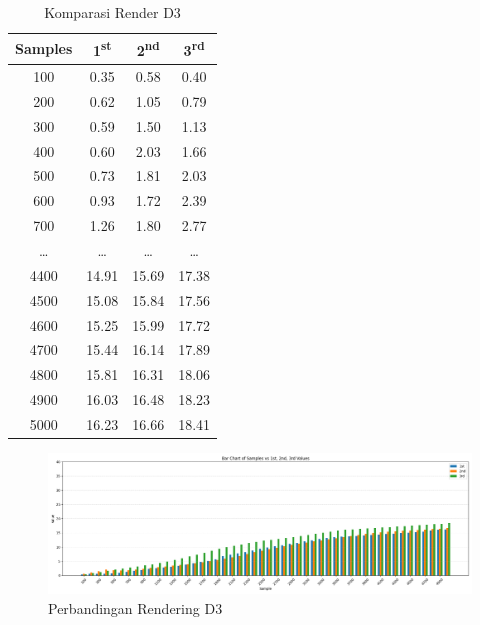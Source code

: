 \begin{table}[H]
	\centering
	\caption{Komparasi Render D3}
	\label{Komparasi Render D3}
	\renewcommand{\arraystretch}{1.2}
	\begin{tabular}{|c|c|c|c|}
		\hline
		\textbf{Samples} & \textbf{1\textsuperscript{st}} & \textbf{2\textsuperscript{nd}} & \textbf{3\textsuperscript{rd}} \\
		\hline
		100  & 0.35 & 0.58 & 0.40 \\
		200  & 0.62 & 1.05 & 0.79 \\
		300  & 0.59 & 1.50 & 1.13 \\
		400  & 0.60 & 2.03 & 1.66 \\
		500  & 0.73 & 1.81 & 2.03 \\
		600  & 0.93 & 1.72 & 2.39 \\
		700  & 1.26 & 1.80 & 2.77 \\
		\ldots & \ldots & \ldots & \ldots \\
		4400 & 14.91 & 15.69 & 17.38 \\
		4500 & 15.08 & 15.84 & 17.56 \\
		4600 & 15.25 & 15.99 & 17.72 \\
		4700 & 15.44 & 16.14 & 17.89 \\
		4800 & 15.81 & 16.31 & 18.06 \\
		4900 & 16.03 & 16.48 & 18.23 \\
		5000 & 16.23 & 16.66 & 18.41 \\
		\hline
	\end{tabular}
\end{table}

 	\begin{figure}[H]
	\centering
	\includegraphics[width=0.8\linewidth]{gambar/Pembahasan/FIX_Render/d3.png}
	\caption{Perbandingan Rendering D3}
	\label{Perbandingan Rendering D3}
\end{figure}

